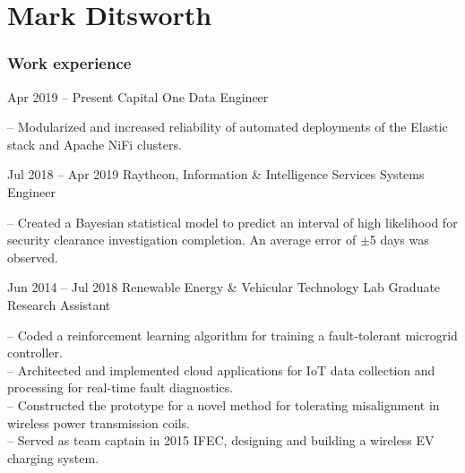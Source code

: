 \documentclass{tccv}
\begin{document}
\part{Mark Ditsworth}

\section{Work experience}

\begin{eventlist}

\item{Apr 2019 -- Present}
    {Capital One}
    {Data Engineer}
    
-- Modularized and increased reliability of automated deployments of the Elastic stack and Apache NiFi clusters.

\item{Jul 2018 -- Apr 2019}
    {Raytheon, Information \& Intelligence Services}
    {Systems Engineer}
    
-- Created a Bayesian statistical model to predict an interval of high
likelihood for security clearance investigation completion. An average
error of $\pm$5 days was observed.

\item{Jun 2014 -- Jul 2018}
     {Renewable Energy \& Vehicular Technology Lab}
     {Graduate Research Assistant}

-- Coded a reinforcement learning algorithm for training a fault-tolerant
microgrid controller.\\
-- Architected and implemented cloud applications for IoT data collection
and processing for real-time fault diagnostics.\\
-- Constructed the prototype for a novel method for tolerating misalignment in wireless power transmission coils.\\
-- Served as team captain in 2015 IFEC, designing and building a wireless EV charging system.

%

\end{eventlist}
\end{document}
